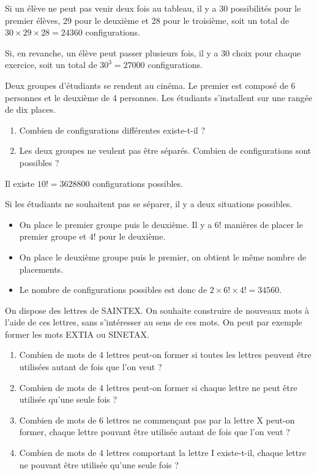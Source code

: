 \documentclass[11pt,fleqn, openany]{book} %
\begin{document}
\begin{solution}Si un élève ne peut pas venir deux fois au tableau, il y a 30 possibilités pour le premier élèves, 29 pour le deuxième et 28 pour le troisième, soit un total de $30 \times 29 \times 28=24360$ configurations.

Si, en revanche, un élève peut passer plusieurs fois, il y a 30 choix pour chaque exercice, soit un total de $30^3=27000$ configurations.\newpage \end{solution}



\begin{exercise}Deux groupes d'étudiants se rendent au cinéma. Le premier est composé de 6 personnes et le deuxième de 4 personnes. Les étudiants s'installent sur une rangée de dix places.
\begin{enumerate}
\item Combien de configurations différentes existe-t-il ?
\item Les deux groupes ne veulent pas être séparés. Combien de configurations sont possibles ?
\end{enumerate}\end{exercise}

\begin{solution}Il existe $10!=3628800$ configurations possibles.

Si les étudiants ne souhaitent pas se séparer, il y a deux situations possibles.
\begin{itemize}
\item On place le premier groupe puis le deuxième. Il y a $6!$ manières de placer le premier groupe et $4!$ pour le deuxième.
\item On place le deuxième groupe puis le premier, on obtient le même nombre de placements.
\item Le nombre de configurations possibles est donc de $2 \times 6! \times 4! = 34560$.
\end{itemize}\end{solution}




\begin{exercise}
On dispose des lettres de SAINTEX. On souhaite construire de nouveaux mots à l'aide de ces lettres, sans s'intéresser au sens de ces mots. On peut par exemple former les mots EXTIA ou SINETAX.
\begin{enumerate}
\item Combien de mots de 4 lettres peut-on former si toutes les lettres peuvent être utilisées autant de fois que l'on veut ?
\item Combien de mots de 4 lettres peut-on former si chaque lettre ne peut être utilisée qu'une seule fois ?
\item Combien de mots de 6 lettres ne commençant pas par la lettre X peut-on former, chaque lettre pouvant être utilisée autant de fois que l'on veut ?
\item Combien de mots de 4 lettres comportant la lettre I existe-t-il, chaque lettre ne pouvant être utilisée qu'une seule fois ?
\end{enumerate}\end{exercise}
\end{document}
